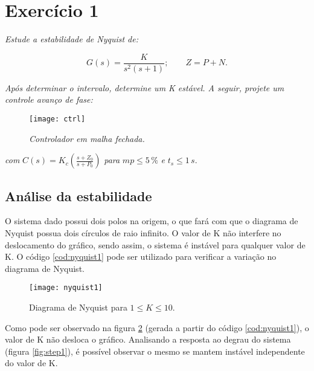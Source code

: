
\section*{Exercício 1}

\emph{Estude a estabilidade de Nyquist de:}

\begin{equation}
\label{equ:g1}
G(s) = \frac{K}{s^2(s+1)}; \qquad Z = P + N.
\end{equation}

\emph{Após determinar o intervalo, determine um K estável. A seguir, projete um controle avanço de fase:}

\begin{figure}[H]
    \centering
    \caption{\emph{Controlador em malha fechada.}}
    \texttt{[image: ctrl]}
    \label{fig:ctrl}
\end{figure}

\emph{com} $C(s) = K_c \left(\frac{s+Z_0}{s+P_0}\right)$ \emph{para} $mp \leq 5 \, \%$ \emph{e} $t_s \leq 1 \, s$.

\subsection*{Análise da estabilidade}

O sistema dado possui dois polos na origem, o que fará com que o diagrama de Nyquist possua dois círculos de raio infinito. O valor de K não interfere no deslocamento do gráfico, sendo assim, o sistema é instável para qualquer valor de K. O código \ref{cod:nyquist1} pode ser utilizado para verificar a variação no diagrama de Nyquist.



\begin{figure}[H]
    \centering
    \caption{Diagrama de Nyquist para $ 1 \leq K \leq 10$.}
    \texttt{[image: nyquist1]}
    \label{fig:nyquist1}
\end{figure}

Como pode ser observado na figura \ref{fig:nyquist1} (gerada a partir do código \ref{cod:nyquist1}), o valor de K não desloca o gráfico. Analisando a resposta ao degrau do sistema (figura \ref{fig:step1}), é possível observar o mesmo se mantem instável independente do valor de K.

